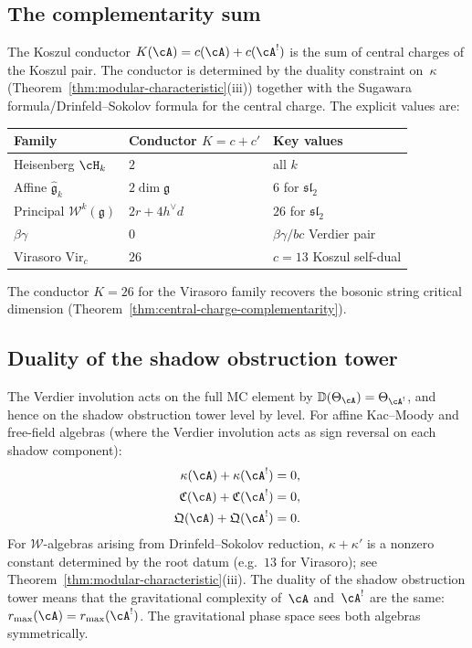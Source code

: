 \subsection{The complementarity sum}
\label{subsec:thqg-intro-complementarity-sum}

The Koszul conductor $K(\cA) = c(\cA) + c(\cA^!)$ is the sum of
central charges of the Koszul pair. The conductor is determined by
the duality constraint on~$\kappa$
(Theorem~\ref{thm:modular-characteristic}(iii)) together with the
Sugawara formula/Drinfeld--Sokolov formula for the central charge. The
explicit values are:
\begin{center}
\small
\begin{tabular}{lll}
\textbf{Family} & \textbf{Conductor $K = c + c'$}
 & \textbf{Key values} \\ \hline
Heisenberg $\cH_k$ & $2$ & all $k$ \\[2pt]
Affine $\widehat{\mathfrak{g}}_k$ & $2\dim\mathfrak{g}$
 & $6$ for $\mathfrak{sl}_2$ \\[2pt]
Principal $\mathcal{W}^k(\mathfrak{g})$
 & $2r + 4h^\vee d$ & $26$ for $\mathfrak{sl}_2$ \\[2pt]
$\beta\gamma$ & $0$ & $\beta\gamma/bc$ Verdier pair \\[2pt]
Virasoro $\mathrm{Vir}_c$ & $26$ & $c = 13$ Koszul self-dual
\end{tabular}
\end{center}
The conductor $K = 26$ for the Virasoro family recovers the bosonic
string critical dimension
(Theorem~\ref{thm:central-charge-complementarity}).

\subsection{Duality of the shadow obstruction tower}
\label{subsec:thqg-intro-duality-shadow}

The Verdier involution acts on the full MC element by
$\mathbb{D}(\Theta_\cA) = \Theta_{\cA^!}$, and hence on the shadow
obstruction tower level by level. For affine Kac--Moody and free-field
algebras (where the Verdier involution acts as sign reversal on each
shadow component):
\begin{align}
\kappa(\cA) + \kappa(\cA^!) &= 0, \label{eq:thqg-intro-kappa-duality} \\
\mathfrak{C}(\cA) + \mathfrak{C}(\cA^!) &= 0, \label{eq:thqg-intro-cubic-duality} \\
\mathfrak{Q}(\cA) + \mathfrak{Q}(\cA^!) &= 0. \label{eq:thqg-intro-quartic-duality}
\end{align}
For $\mathcal{W}$-algebras arising from Drinfeld--Sokolov reduction,
$\kappa + \kappa'$ is a nonzero constant determined by the root datum
(e.g.\ $13$ for Virasoro); see
Theorem~\ref{thm:modular-characteristic}(iii).
The duality of the shadow obstruction tower means that the gravitational complexity
of~$\cA$ and~$\cA^!$ are the same: $r_{\max}(\cA) = r_{\max}(\cA^!)$.
The gravitational phase space sees both algebras symmetrically.


